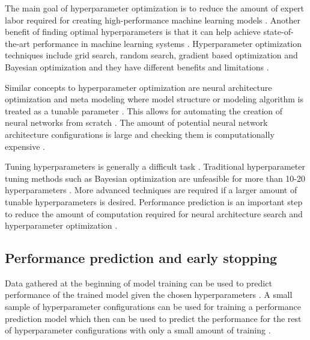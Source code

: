 The main goal of hyperparameter optimization is to reduce the amount of expert labor required for creating high-performance machine learning models \parencite{bakerAcceleratingNeuralArchitecture2017}.
Another benefit of finding optimal hyperparameters is that it can help achieve state-of-the-art performance in machine learning systems \parencite{maclaurinGradientbasedHyperparameterOptimization2015}.
Hyperparameter optimization techniques include grid search, random search, gradient based optimization and Bayesian optimization and they have different benefits and limitations \parencite{yangHyperparameterOptimizationMachine2020}.

Similar concepts to hyperparameter optimization are neural architecture optimization and meta modeling where model structure or modeling algorithm is treated as a tunable parameter \parencite{bakerAcceleratingNeuralArchitecture2017}. This allows for automating the creation of neural networks from scratch \parencite{bakerAcceleratingNeuralArchitecture2017}. The amount of potential neural network architecture configurations is large and checking them is computationally expensive \parencite{bakerAcceleratingNeuralArchitecture2017}.

Tuning hyperparameters is generally a difficult task \parencite{maclaurinGradientbasedHyperparameterOptimization2015}. Traditional hyperparameter tuning methods such as Bayesian optimization are unfeasible for more than 10-20 hyperparameters \parencite{maclaurinGradientbasedHyperparameterOptimization2015}.
More advanced techniques are required if a larger amount of tunable hyperparameters is desired.
Performance prediction is an important step to reduce the amount of computation required for neural architecture search and hyperparameter optimization \parencite{bakerAcceleratingNeuralArchitecture2017}.

\subsection{Performance prediction and early stopping}

Data gathered at the beginning of model training can be used to predict performance of the trained model given the chosen hyperparameters \parencite{bakerAcceleratingNeuralArchitecture2017}. A small sample of hyperparameter configurations can be used for training a performance prediction model which then can be used to predict the performance for the rest of hyperparameter configurations with only a small amount of training \parencite{bakerAcceleratingNeuralArchitecture2017}.

